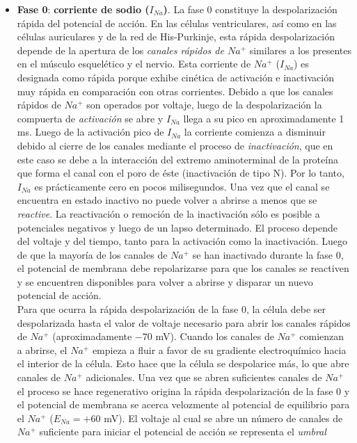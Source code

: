 \begin{itemize}
  \item \textbf{Fase 0}: \textbf{corriente de sodio ($I_{Na}$)}. La fase 0 constituye la despolarización rápida del
  potencial de acción. En las células ventriculares, así como en las células auriculares y de la red de His-Purkinje,
  esta rápida despolarización depende de la apertura de los \textit{canales rápidos de $Na^+$} similares a los
  presentes en el músculo esquelético y el nervio. Esta corriente de $Na^+$ ($I_{Na}$) es designada como rápida porque
  exhibe cinética de activación e inactivación muy rápida en comparación con otras corrientes.
  Debido a que los canales rápidos de $Na^+$ son operados por voltaje, luego de la despolarización la compuerta
  de \textit{activación} se abre y $I_{Na}$ llega a su pico en aproximadamente 1 ms. Luego de la activación pico
  de $I_{Na}$ la corriente comienza a disminuir debido al cierre de los canales mediante el proceso de
  \textit{inactivación}, que en este caso se debe a la interacción del extremo aminoterminal de la proteína
  que forma el canal con el poro de éste (inactivación de tipo N). Por lo tanto, $I_{Na}$ es prácticamente cero en
  pocos milisegundos. Una vez que el canal se encuentra en estado inactivo no puede volver a abrirse a menos que
  se \textit{reactive}. La reactivación o remoción de la inactivación sólo es posible a potenciales negativos y luego
  de un lapso determinado. El proceso depende del voltaje y del tiempo, tanto para la activación como la inactivación.
  Luego de que la mayoría de los canales de $Na^+$ se han inactivado durante la fase 0, el potencial de membrana debe
  repolarizarse para que los canales se reactiven y se encuentren disponibles para volver a abrirse y disparar un nuevo
  potencial de acción. \\
  Para que ocurra la rápida despolarización de la fase 0, la célula debe ser despolarizada hasta el valor de voltaje
  necesario para abrir los canales rápidos de $Na^+$ (aproximadamente $-70$ mV). Cuando los canales de $Na^+$ comienzan
  a abrirse, el $Na^+$ empieza a fluir a favor de su gradiente electroquímico hacia el interior de la célula. Esto hace
  que la célula se despolarice más, lo que abre canales de $Na^+$ adicionales. Una vez que se abren suficientes canales
  de $Na^+$ el proceso se hace regenerativo origina la rápida despolarización de la fase 0 y el potencial de membrana
  se acerca velozmente al potencial de equilibrio para el $Na^+$ ($E_{Na} = +60$ mV). El voltaje al cual se abre un
  número de canales de $Na^+$ suficiente para iniciar el potencial de acción se representa el \textit{umbral}

\end{itemize}
